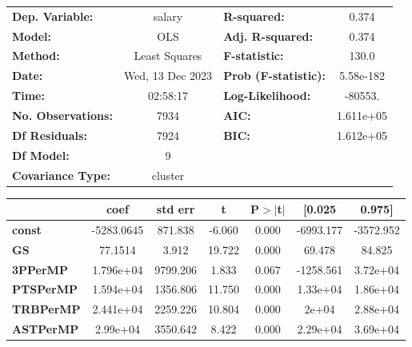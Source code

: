 \begin{center}
\begin{tabular}{lclc}
\toprule
\textbf{Dep. Variable:}    &      salary      & \textbf{  R-squared:         } &     0.374   \\
\textbf{Model:}            &       OLS        & \textbf{  Adj. R-squared:    } &     0.374   \\
\textbf{Method:}           &  Least Squares   & \textbf{  F-statistic:       } &     130.0   \\
\textbf{Date:}             & Wed, 13 Dec 2023 & \textbf{  Prob (F-statistic):} & 5.58e-182   \\
\textbf{Time:}             &     02:58:17     & \textbf{  Log-Likelihood:    } &   -80553.   \\
\textbf{No. Observations:} &        7934      & \textbf{  AIC:               } & 1.611e+05   \\
\textbf{Df Residuals:}     &        7924      & \textbf{  BIC:               } & 1.612e+05   \\
\textbf{Df Model:}         &           9      & \textbf{                     } &             \\
\textbf{Covariance Type:}  &     cluster      & \textbf{                     } &             \\
\bottomrule
\end{tabular}
\begin{tabular}{lcccccc}
                       & \textbf{coef} & \textbf{std err} & \textbf{t} & \textbf{P$> |$t$|$} & \textbf{[0.025} & \textbf{0.975]}  \\
\midrule
\textbf{const}         &   -5283.0645  &      871.838     &    -6.060  &         0.000        &    -6993.177    &    -3572.952     \\
\textbf{GS}            &      77.1514  &        3.912     &    19.722  &         0.000        &       69.478    &       84.825     \\
\textbf{3PPerMP}       &    1.796e+04  &     9799.206     &     1.833  &         0.067        &    -1258.561    &     3.72e+04     \\
\textbf{PTSPerMP}      &    1.594e+04  &     1356.806     &    11.750  &         0.000        &     1.33e+04    &     1.86e+04     \\
\textbf{TRBPerMP}      &    2.441e+04  &     2259.226     &    10.804  &         0.000        &        2e+04    &     2.88e+04     \\
\textbf{ASTPerMP}      &     2.99e+04  &     3550.642     &     8.422  &         0.000        &     2.29e+04    &     3.69e+04     \\

\end{tabular}
\end{center}
